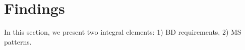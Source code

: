 \documentclass{bmcart}
\begin{document}




\section{Findings}

In this section, we present two integral elements: 1) BD requirements, 2) MS patterns.
\end{document}
